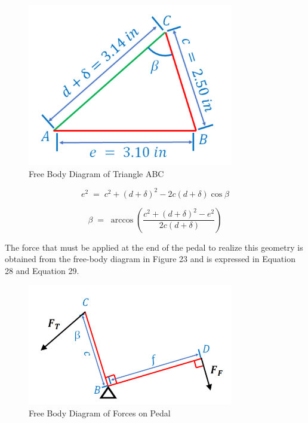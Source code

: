 \documentclass[12pt]{article}
\theoremstyle{definition} %
\theoremstyle{plain} %
\begin{document}
\begin{figure}[htbp]
  \centering
  \includegraphics[width=0.8\textwidth]{classes/Mathematics-of-Guitar-Strings/06-10/fgs/fig22.png}
  \caption{Free Body Diagram of Triangle ABC}
  \label{fig:}
\end{figure}

\begin{equation}
  e^{2}
  \;=\;
  c^{2} + (d+\delta)^{2} - 2c(d+\delta)\cos\beta
  \tag{26}
\end{equation}

\begin{equation}
  \beta \;=\;
  \arccos\!\left(
    \frac{c^{2} + (d+\delta)^{2} - e^{2}}{\,2c(d+\delta)}
  \right)
  \tag{27}
\end{equation}

The force that must be applied at the end of the pedal to realize this geometry is obtained from the free-body diagram in Figure 23 and is expressed in Equation 28 and Equation 29.

\begin{figure}[htbp]
  \centering
  \includegraphics[width=0.8\textwidth]{classes/Mathematics-of-Guitar-Strings/06-10/fgs/fig23.png}
  \caption{Free Body Diagram of Forces on Pedal}
  \label{fig:}
\end{figure}
\end{document}
